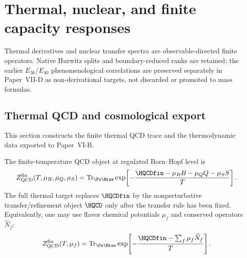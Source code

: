 \documentclass[12pt,a4paper]{article}
\begin{document}
\begingroup
\small
\RaggedRight
\setlength{\emergencystretch}{10em}
\sloppy
\endgroup




\section{Thermal, nuclear, and finite capacity responses}
\label{p11:sec:v237-b6}
Thermal derivatives and nuclear transfer spectra are observable-directed finite operators. Native Hurwitz splits and boundary-reduced ranks are retained; the earlier $E_{36}/E_{40}$ phenomenological correlations are preserved separately in Paper~VII-D as non-derivational targets, not discarded or promoted to mass formulas.

\subsection[Finite-temperature QCD and cosmological export]
{Thermal QCD and cosmological export}
\label{p11:sec:thermal-cosmology-export}

This section constructs the finite thermal QCD trace and the thermodynamic data exported to Paper~VI-B.

\begin{definition}
\label{p11:def:native-thermal-partition-function}
\leavevmode\par\noindent
The finite-temperature QCD object at regulated Born--Hopf level is
\begin{equation}
\label{p11:eq:native-thermal-partition-function}
Z_{\rm QCD}^{\rm fin}(T,\mu_B,\mu_Q,\mu_S)
=
\operatorname{Tr}_{\Ps\Hraw}
\exp\!\left[-\frac{\HQCDfin-\mu_BB-\mu_QQ-\mu_SS}{T}\right].
\end{equation}
The full thermal target replaces \(\HQCDfin\) by the nonperturbative
transfer/refinement object \(\HQCD\) only after the transfer rule has been
fixed. Equivalently, one may use flavor chemical potentials \(\mu_f\) and
conserved operators \(\widehat N_f\):
\begin{equation}
\label{p11:eq:native-thermal-partition-flavor}
Z_{\rm QCD}^{\rm fin}(T,\mu_f)
=
\operatorname{Tr}_{\Ps\Hraw}
\exp\!\left[-\frac{\HQCDfin-\sum_f\mu_f\widehat N_f}{T}\right].
\end{equation}
\end{definition}
\end{document}
